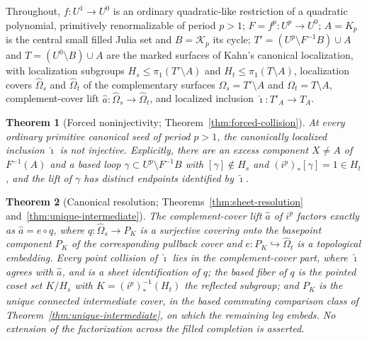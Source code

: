 \documentclass[11pt,reqno]{amsart}
\newtheorem{theorem}{Theorem}[section]
\theoremstyle{definition}
\theoremstyle{remark}
\begin{document}
Throughout, $f\colon U^{1}\to U^{0}$ is an ordinary quadratic-like
restriction of a quadratic polynomial, primitively renormalizable of
period $p>1$; $F=f^{p}\colon U^{p}\to U^{0}$; $A=K_{p}$ is the central
small filled Julia set and $B=\mathcal K_{p}$ its cycle;
$T'=(U^{p}\setminus F^{-1}B)\cup A$ and $T=(U^{0}\setminus B)\cup A$ are
the marked surfaces of Kahn's canonical localization, with localization
subgroups $H_{s}\le\pi_{1}(T'\setminus A)$ and
$H_{t}\le\pi_{1}(T\setminus A)$, localization covers
$\widehat\Omega_{s}$ and $\widehat\Omega_{t}$ of the complementary
surfaces $\Omega_{s}=T'\setminus A$ and $\Omega_{t}=T\setminus A$,
complement-cover lift
$\widehat a\colon\widehat\Omega_{s}\to\widehat\Omega_{t}$, and localized
inclusion $\widehat\imath\colon T'_{A}\to T_{A}$.

\begin{theorem}[Forced noninjectivity; Theorem~\ref{thm:forced-collision}]
\label{thm:A}
At every ordinary primitive canonical seed of period $p>1$, the
canonically localized inclusion $\widehat\imath$ is not injective.
Explicitly, there are an excess component $X\neq A$ of $F^{-1}(A)$ and a
based loop $\gamma\subset U^{p}\setminus F^{-1}B$ with
$[\gamma]\notin H_{s}$ and $(i^{p})_{*}[\gamma]=1\in H_{t}$, and the
lift of $\gamma$ has distinct endpoints identified by
$\widehat\imath$.
\end{theorem}

\begin{theorem}[Canonical resolution; Theorems~\ref{thm:sheet-resolution}
and~\ref{thm:unique-intermediate}]\label{thm:B}
The complement-cover lift $\widehat a$ of $i^{p}$ factors exactly as
$\widehat a=e\circ q$, where
$q\colon\widehat\Omega_{s}\to P_{K}$ is a surjective covering onto the
basepoint component $P_{K}$ of the corresponding pullback cover and
$e\colon P_{K}\hookrightarrow\widehat\Omega_{t}$ is a topological
embedding.  Every point collision of $\widehat\imath$ lies in the
complement-cover part, where $\widehat\imath$ agrees with $\widehat a$,
and is a sheet identification of $q$; the
based fiber of $q$ is the pointed coset set $K/H_{s}$ with
$K=(i^{p})_{*}^{-1}(H_{t})$ the reflected subgroup; and $P_{K}$ is the
unique connected intermediate cover, in the based commuting comparison
class of Theorem~\ref{thm:unique-intermediate}, on which the remaining
leg embeds.  No extension of the factorization across the filled
completion is asserted.
\end{theorem}
\end{document}

